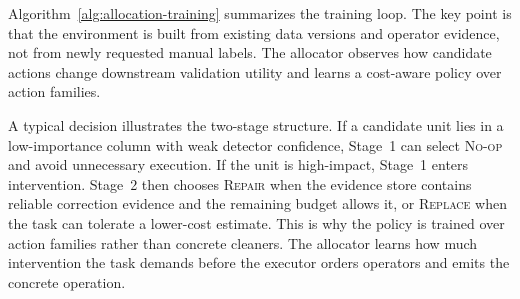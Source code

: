 \documentclass[sigconf, nonacm]{acmart}
\newcommand{\noop}{\textsc{No-op}\xspace}
\newcommand{\repair}{\textsc{Repair}\xspace}
\newcommand{\replaceop}{\textsc{Replace}\xspace}
\begin{document}
Algorithm~\ref{alg:allocation-training} summarizes the training loop. The key point is that the environment is built from existing data versions and operator evidence, not from newly requested manual labels. The allocator observes how candidate actions change downstream validation utility and learns a cost-aware policy over action families.

A typical decision illustrates the two-stage structure. If a candidate unit lies in a low-importance column with weak detector confidence, Stage~1 can select \noop and avoid unnecessary execution. If the unit is high-impact, Stage~1 enters intervention. Stage~2 then chooses \repair when the evidence store contains reliable correction evidence and the remaining budget allows it, or \replaceop when the task can tolerate a lower-cost estimate. This is why the policy is trained over action families rather than concrete cleaners. The allocator learns how much intervention the task demands before the executor orders operators and emits the concrete operation.
\end{document}
